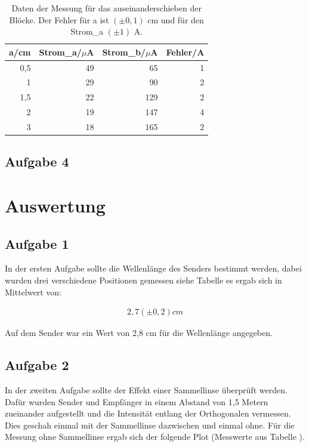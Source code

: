 \documentclass[12pt]{scrartcl}
\begin{document}
\begin{table}[htbp]
\caption{Daten der Messung für das auseinanderschieben der Blöcke. Der Fehler für a ist $(\pm 0,1)$ cm und für den Strom\_a $(\pm 1)$ A.}
\centering
\begin{tabular}{|r|r|r|r|}
\hline
\multicolumn{1}{|l|}{a/cm} & \multicolumn{1}{l|}{Strom\_a/$\mu$A} & \multicolumn{1}{l|}{Strom\_b/$\mu$A} & \multicolumn{1}{l|}{Fehler/A} \\ \hline
0,5 & 49 & 65 & 1 \\ \hline
1 & 29 & 90 & 2 \\ \hline
1,5 & 22 & 129 & 2 \\ \hline
2 & 19 & 147 & 4 \\ \hline
3 & 18 & 165 & 2 \\ \hline
\end{tabular}
\label{tab:a_3_m}
\end{table}

\subsection{Aufgabe 4}







\section{Auswertung}
\subsection{Aufgabe 1}
In der ersten Aufgabe sollte die Wellenlänge des Senders bestimmt werden, dabei wurden drei verschiedene Positionen gemessen siehe Tabelle  %
es ergab sich in Mittelwert von:

\begin{align*}
2,7 (\pm 0,2) cm
\end{align*}


Auf dem Sender war ein Wert von 2,8 cm für die Wellenlänge angegeben.

\subsection{Aufgabe 2}
In der zweiten Aufgabe sollte der Effekt einer Sammellinse überprüft werden.
Dafür wurden Sender und Empfänger in einem Abstand von 1,5 Metern zueinander aufgestellt und die Intensität entlang der Orthogonalen vermessen. Dies geschah einmal mit der Sammellinse dazwischen und einmal ohne. Für die Messung ohne Sammellinse ergab sich der folgende Plot (Messwerte aus Tabelle %
).
\end{document}
